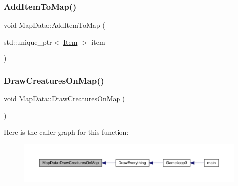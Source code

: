 \mbox{\label{class_map_data_a27d20220e1bd6db934312f30a15dbcb0}} 
\subsubsection{\texorpdfstring{Add\+Item\+To\+Map()}{AddItemToMap()}\hspace{0.1cm}{\footnotesize\ttfamily [2/2]}}
{\footnotesize\ttfamily void Map\+Data\+::\+Add\+Item\+To\+Map (\begin{DoxyParamCaption}\item[{std\+::unique\+\_\+ptr$<$ \mbox{\hyperlink{class_item}{Item}} $>$}]{item }\end{DoxyParamCaption})}

\mbox{\label{class_map_data_ad7ff044e19425487082134fe86221d07}} 
\subsubsection{\texorpdfstring{Draw\+Creatures\+On\+Map()}{DrawCreaturesOnMap()}}
{\footnotesize\ttfamily void Map\+Data\+::\+Draw\+Creatures\+On\+Map (\begin{DoxyParamCaption}{ }\end{DoxyParamCaption})}

Here is the caller graph for this function\+:
\nopagebreak
\begin{figure}[H]
\begin{center}
\leavevmode
\includegraphics[width=350pt]{de/d83/class_map_data_ad7ff044e19425487082134fe86221d07_icgraph}
\end{center}
\end{figure}
\mbox{\label{class_map_data_abfdefc2bef87a02d3d83176ad6ba7832}} 
